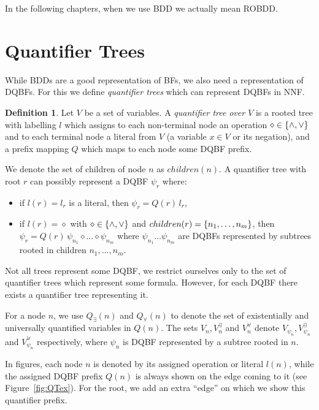 \documentclass[
  digital, %
  color,
  twoside, %
  table,   %
  nolof,     %
  nolot,     %
]{fithesis3}
\let\setbuilder\set
\newcommand{\simpleset}[1]{\{{#1}\}}
\renewcommand{\set}[1]{\normalexpandarg\IfSubStr{#1}{|}{\setbuilder{#1}}{\simpleset{#1}}}
\theoremstyle{definition}
\newtheorem{definition}{Definition}
\theoremstyle{remark}
\newcommand{\vars}[1]{V_{#1}}
\newcommand{\evars}[1]{V_{#1}^{\exists}}
\newcommand{\uvars}[1]{V_{#1}^{\forall}}
\newcommand{\itholds}{\,}
\newcommand{\qtlabel}[1]{l({#1})}
\newcommand{\prefix}[1]{Q({#1})}
\newcommand{\eprefix}[1]{Q_{\exists}(#1)}
\newcommand{\uprefix}[1]{Q_{\forall}(#1)}
\newcommand{\children}[1]{children({#1})}
\begin{document}
In the following chapters, when we use BDD we actually mean ROBDD.


\section{Quantifier Trees}
\label{sec:QT}
While BDDs are a good representation of BFs, we also need a representation of DQBFs. For this we define \emph{quantifier trees} which can represent DQBFs in NNF.

\begin{definition}
  Let $V$ be a set of variables. A \emph{quantifier tree} \emph{over $V$} is a rooted tree with labelling $l$ which assigns to each non-terminal node an operation ${\diamond} \in \set{{\land},{\lor}}$ and to each terminal node a literal from $V$ (a variable $x \in V$ or its negation), and a prefix mapping $Q$ which maps to each node some DQBF prefix.
\end{definition}

We denote the set of children of node $n$ as $\children{n}$.  A quantifier tree with root $r$ can possibly represent a DQBF $\psi_r$ where:
\begin{itemize}
    \item if $\qtlabel{r} = l_r$ is a literal, then $\psi_r = \prefix{r} \itholds l_r$,
    \item if $\qtlabel{r} = {\diamond}$ with ${\diamond} \in \set{{\land},{\lor}}$ and $\children{r} = \set{n_1,\dots, n_m}$, then $\psi_r = \prefix{r} \itholds \psi_{n_1} \diamond \dots \diamond \psi_{n_m}$ where $\psi_{n_1} \dots \psi_{n_m}$ are DQBFs represented by subtrees rooted in children $n_1,\dots,n_m$.
\end{itemize}
Not all trees represent some DQBF, we restrict ourselves only to the set of quantifier trees which represent some formula. However, for each DQBF there exists a quantifier tree representing it.

For a node $n$, we use $\eprefix{n}$ and $\uprefix{n}$ to denote the set of existentially and universally quantified variables in $\prefix{n}$. The sets $\vars{n}, \evars{n}$ and $\uvars{n}$ denote $\vars{\psi_n}, \evars{\psi_n}$ and $\uvars{\psi_n}$ respectively, where $\psi_n$ is DQBF represented by a subtree rooted in $n$.

In figures, each node $n$ is denoted by its assigned operation or literal $\qtlabel{n}$, while the assigned DQBF prefix $\prefix{n}$ is always shown on the edge coming to it (see Figure~\ref{fig:QTex}). For the root, we add an extra ``edge'' on which we show this quantifier prefix.
\end{document}
